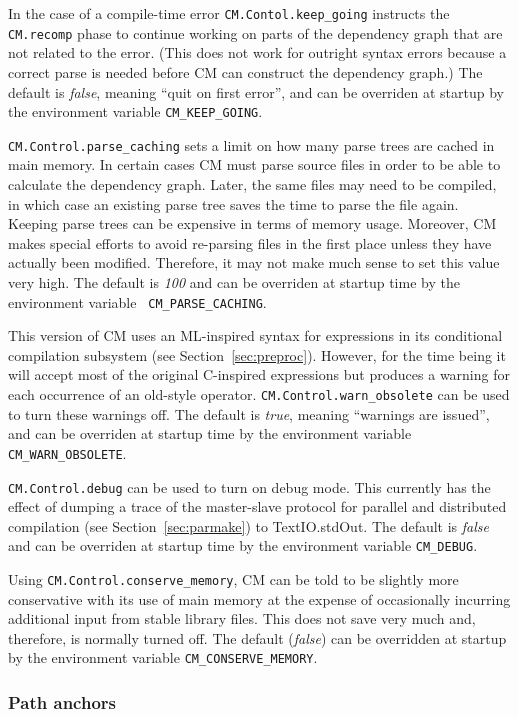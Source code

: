 \documentclass[titlepage,letterpaper]{article}
\begin{document}
In the case of a compile-time error {\tt CM.Contol.keep\_going}
instructs the {\tt CM.recomp} phase to continue working on parts of
the dependency graph that are not related to the error.  (This does
not work for outright syntax errors because a correct parse is needed
before CM can construct the dependency graph.)  The default is {\em
false}, meaning ``quit on first error'', and can be overriden at
startup by the environment variable {\tt CM\_KEEP\_GOING}.

{\tt CM.Control.parse\_caching} sets a limit on how many parse trees
are cached in main memory.  In certain cases CM must parse source
files in order to be able to calculate the dependency graph.  Later,
the same files may need to be compiled, in which case an existing
parse tree saves the time to parse the file again.  Keeping parse
trees can be expensive in terms of memory usage.  Moreover, CM makes
special efforts to avoid re-parsing files in the first place unless
they have actually been modified.  Therefore, it may not make much
sense to set this value very high.  The default is {\em 100} and can
be overriden at startup time by the environment variable {\tt
CM\_PARSE\_CACHING}.

This version of CM uses an ML-inspired syntax for expressions in its
conditional compilation subsystem (see Section~\ref{sec:preproc}).
However, for the time being it will accept most of the original
C-inspired expressions but produces a warning for each occurrence of
an old-style operator. {\tt CM.Control.warn\_obsolete} can be used to
turn these warnings off. The default is {\em true}, meaning ``warnings
are issued'', and can be overriden at startup time by the environment
variable {\tt CM\_WARN\_OBSOLETE}.

{\tt CM.Control.debug} can be used to turn on debug mode.  This
currently has the effect of dumping a trace of the master-slave
protocol for parallel and distributed compilation (see
Section~\ref{sec:parmake}) to TextIO.stdOut. The default is {\em
false} and can be overriden at startup time by the environment
variable {\tt CM\_DEBUG}.

Using {\tt CM.Control.conserve\_memory}, CM can be told to be slightly
more conservative with its use of main memory at the expense of
occasionally incurring additional input from stable library files.
This does not save very much and, therefore, is normally turned off.
The default ({\em false}) can be overridden at startup by the
environment variable {\tt CM\_CONSERVE\_MEMORY}.

\subsubsection{Path anchors}
\label{sec:api:anchors}
\end{document}
